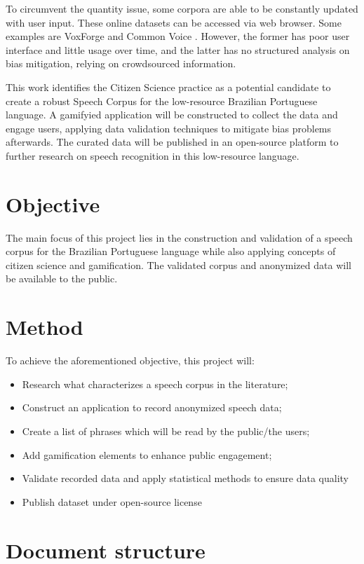 To circumvent the quantity issue, some corpora are able to be constantly updated with user input. These online datasets can be accessed via web browser. Some examples are VoxForge and Common Voice \cite{ardila2019common}. However, the former has poor user interface and little usage over time, and the latter has no structured analysis on bias mitigation, relying on crowdsourced information.

This work identifies the Citizen Science practice as a potential candidate to create a robust Speech Corpus for the low-resource Brazilian Portuguese language. A gamifyied application will be constructed to collect the data and engage users, applying data validation techniques to mitigate bias problems afterwards. The curated data will be published in an open-source platform to further research on speech recognition in this low-resource language.

\section*{Objective}

The main focus of this project lies in the construction and validation of a speech corpus for the Brazilian Portuguese language while also applying concepts of citizen science and gamification. The validated corpus and anonymized data will be available to the public.

\section*{Method}

To achieve the aforementioned objective, this project will:

\begin{itemize}
    \item Research what characterizes a speech corpus in the literature;
    \item Construct an application to record anonymized speech data;
    \item Create a list of phrases which will be read by the public/the users;
    \item Add gamification elements to enhance public engagement;
    \item Validate recorded data and apply statistical methods to ensure data quality
    \item Publish dataset under open-source license
\end{itemize}

\section*{Document structure}

